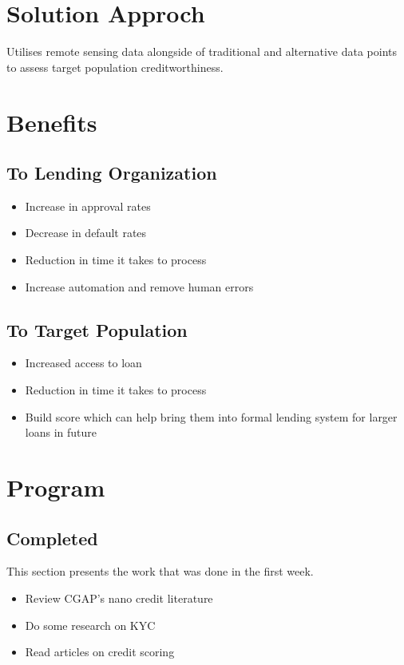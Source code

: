 \documentclass[12pt,a4paper]{amsart}
\numberwithin{equation}{section}
\theoremstyle{plain}
\theoremstyle{definition}
\begin{document}
\section{Solution Approch}
Utilises remote sensing data alongside of traditional and alternative data points to assess target population creditworthiness.
\section{Benefits}

\subsection{To Lending Organization}
\begin{itemize}
 \item Increase in approval rates
 \item Decrease in default rates
 \item Reduction in time it takes to process
 \item Increase automation and remove human errors
\end{itemize}

\subsection{To Target Population}
\begin{itemize}
 \item Increased access to loan
 \item Reduction in time it takes to process
 \item Build score which can help bring them into formal lending system for larger loans in future
\end{itemize}

\section{Program}

\subsection{Completed}
This section presents the work that was done in the first week.
\begin{itemize}
 \item Review CGAP's nano credit literature
 \item Do some research on KYC
 \item Read articles on credit scoring
\end{itemize}
\end{document}
